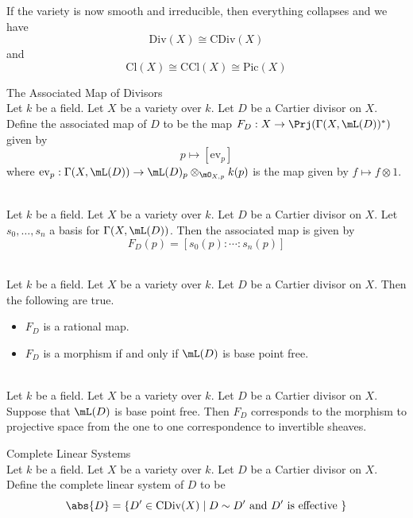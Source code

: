 \documentclass[a4paper]{article}
\begin{document}
If the variety is now smooth and irreducible, then everything collapses and we have $$\text{Div}(X)\cong\text{CDiv}(X)$$ and $$\text{Cl}(X)\cong\text{CCl}(X)\cong\text{Pic}(X)$$

\begin{defn}{The Associated Map of Divisors}{}\\
Let $k$ be a field. Let $X$ be a variety over $k$. Let $D$ be a Cartier divisor on $X$. Define the associated map of $D$ to be the map $F_D:X\to\Prj(\Gamma(X,\mL(D))^\ast)$ given by $$p\mapsto\left[\text{ev}_p\right]$$ where $\text{ev}_p:\Gamma(X,\mL(D))\to\mL(D)_p\otimes_{\mO_{X,p}}k(p)$ is the map given by $f\mapsto f\otimes 1$. 
\end{defn}

\begin{lmm}{}{}\\
Let $k$ be a field. Let $X$ be a variety over $k$. Let $D$ be a Cartier divisor on $X$. Let $s_0,\dots,s_n$ a basis for $\Gamma(X,\mL(D))$. Then the associated map is given by $$F_D(p)=[s_0(p):\cdots:s_n(p)]$$
\end{lmm}

\begin{lmm}{}{}\\
Let $k$ be a field. Let $X$ be a variety over $k$. Let $D$ be a Cartier divisor on $X$. Then the following are true. 
\begin{itemize}
\item $F_D$ is a rational map. 
\item $F_D$ is a morphism if and only if $\mL(D)$ is base point free. 
\end{itemize}
\end{lmm}

\begin{lmm}{}{}\\
Let $k$ be a field. Let $X$ be a variety over $k$. Let $D$ be a Cartier divisor on $X$. Suppose that $\mL(D)$ is base point free. Then $F_D$ corresponds to the morphism to projective space from the one to one correspondence to invertible sheaves. 
\end{lmm}

\begin{defn}{Complete Linear Systems}{}\\
Let $k$ be a field. Let $X$ be a variety over $k$. Let $D$ be a Cartier divisor on $X$. Define the complete linear system of $D$ to be $$\abs{D}=\{D'\in\text{CDiv}(X)\;|\;D\sim D'\text{ and }D'\text{ is effective }\}$$
\end{defn}
\end{document}
